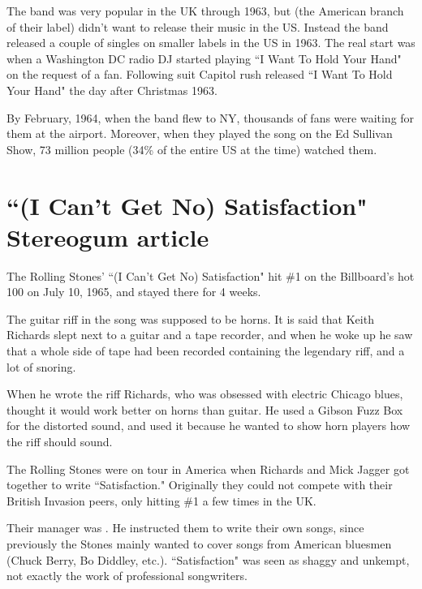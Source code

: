 \documentclass[12pt, a4paper, twoside, openright, titlepage]{book}
\begin{document}
\begin{rmk}{}{}
    The band was very popular in the UK through 1963, but  (the American branch of their label) didn't want to release their music in the US. Instead the band released a couple of singles on smaller labels in the US in 1963. The real start was when a Washington DC radio DJ started playing ``I Want To Hold Your Hand" on the request of a fan. Following suit Capitol rush released ``I Want To Hold Your Hand" the day after Christmas 1963.
\end{rmk}


By February, 1964, when the band flew to NY, thousands of fans were waiting for them at the airport. Moreover, when they played the song on the Ed Sullivan Show, 73 million people (34\% of the entire US at the time) watched them.



\section{``(I Can't Get No) Satisfaction" Stereogum article}

The Rolling Stones' ``(I Can't Get No) Satisfaction" hit \#1 on the Billboard's hot 100 on July 10, 1965, and stayed there for 4 weeks.

\begin{note}{}{}
    The guitar riff in the song was supposed to be horns. It is said that Keith Richards slept next to a guitar and a tape recorder, and when he woke up he saw that a whole side of tape had been recorded containing the legendary riff, and a lot of snoring.
\end{note}

When he wrote the riff Richards, who was obsessed with electric Chicago blues, thought it would work better on horns than guitar. He used a Gibson Fuzz Box for the distorted sound, and used it because he wanted to show horn players how the riff should sound.


The Rolling Stones were on tour in America when Richards and Mick Jagger got together to write ``Satisfaction." Originally they could not compete with their British Invasion peers, only hitting \#1 a few times in the UK.


Their manager was . He instructed them to write their own songs, since previously the Stones mainly wanted to cover songs from American bluesmen (Chuck Berry, Bo Diddley, etc.). ``Satisfaction" was seen as shaggy and unkempt, not exactly the work of professional songwriters.
\end{document}
